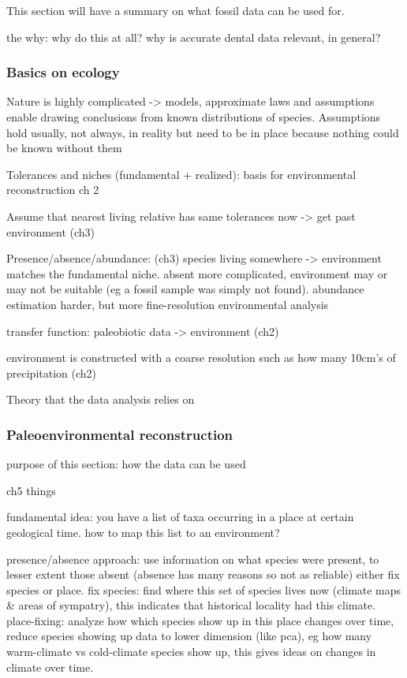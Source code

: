 \documentclass{article}
\begin{document}
This section will have a summary on what fossil data can be used for.

the why: why do this at all? why is accurate dental data relevant, in general?

\subsubsection{Basics on ecology}

Nature is highly complicated -> models, approximate laws and assumptions enable drawing conclusions from
known distributions of species. Assumptions hold usually, not always, in reality but need to be in place 
because nothing could be known without them

Tolerances and niches (fundamental + realized): basis for environmental reconstruction \cite{Faith_Lyman_2019} ch 2

Assume that nearest living relative has same tolerances now -> get past environment (ch3)

Presence/absence/abundance: (ch3) species living somewhere -> environment matches the fundamental niche. absent more complicated,
environment may or may not be suitable (eg a fossil sample was simply not found). abundance estimation harder, but more
fine-resolution environmental analysis

transfer function: paleobiotic data -> environment (ch2)

environment is constructed with a coarse resolution such as how many 10cm's of precipitation (ch2)

Theory that the data analysis relies on

\subsubsection{Paleoenvironmental reconstruction}

purpose of this section: how the data can be used

ch5 things

fundamental idea: you have a list of taxa occurring in a place at certain geological time.
how to map this list to an environment?

presence/absence approach: use information on what species were present, to lesser extent those absent (absence has many reasons so not as reliable)
either fix species or place. fix species: find where this set of species lives now (climate maps \& areas of sympatry), this indicates 
that historical locality had this climate. place-fixing: analyze how which species show up in this place
 changes over time, reduce species showing up data to lower dimension
(like pca), eg how many warm-climate vs cold-climate species show up, this gives ideas on changes in climate over time.
\end{document}
